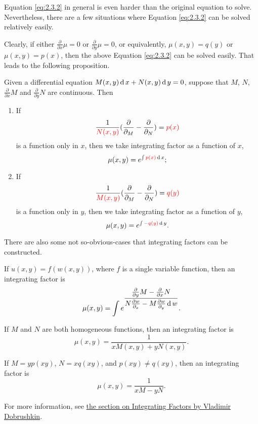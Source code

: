 Equation \ref{eq:2.3.2} in general is even harder than the original equation to solve. Nevertheless, there are a few situations where Equation \ref{eq:2.3.2} can be solved relatively easily.

Clearly, if either $\frac{\partial}{\partial x} \mu=0$ or $\frac{\partial}{\partial y} \mu=0$, or equivalently, $\mu(x, y)=q(y)$ or $\mu(x, y)=p(x)$, then the above Equation \ref{eq:2.3.2} can be solved easily. That leads to the following proposition.

\begin{proposition}\label{prop:intfactor} Given a differential equation $ M(x,y) \operatorname{d} x +  N(x,y) \operatorname{d} y =0$, suppose that $M$, $N$, $\frac{\partial}{\partial x} M$ and $\frac{\partial}{\partial y} N$ are continuous. Then  
\begin{enumerate}[label={Type \Roman*:}, leftmargin=*, align=left]
  \item If \[\frac{1}{{\color{red}N(x,y)}}(\frac{\partial}{\partial_ M}-\frac{\partial}{\partial_ N})={\color{red}p(x)}\]
  is a function {\color{red}only in $x$}, then we take integrating factor as a function of $x$, \[\mu(x,y)=e^{\int {\color{red}p(x)}\operatorname{d} x};\]
  \item If \[\frac{1}{{\color{red}M(x,y)}}(\frac{\partial}{\partial_ M}-\frac{\partial}{\partial_ N})={\color{red}q(y)}\]
  is a function {\color{red} only in $y$}, then we take integrating factor as a function of $y$,
  \[\mu(x,y)=e^{\int {\color{blue}-}{\color{red}q(y)}\operatorname{d} y}.\]
\end{enumerate}
\end{proposition}

\begin{remark}
	There are also some not so-obvious-cases that integrating factors can be constructed.
  
  If $u(x, y)=f(w(x, y))$, where $f$ is a single variable function, then an integrating factor is
  \[\mu(x, y)=\int e^{\dfrac{\frac{\partial}{\partial y} M - \frac{\partial}{\partial x} N}{N\frac{\partial w}{\partial_x}-M\frac{\partial w}{\partial_y}\operatorname{d} w}}.\]

  If $M$ and $N$ are both homogeneous functions, then an integrating factor is
  \[\mu(x,y) = \frac{1}{x M(x,y) + y N(x,y)}.
  \]

  If $M=yp(xy)$, $N=xq(xy)$, and $p(xy)\ne q(xy)$, then an integrating factor is
  \[\mu(x, y)=\frac{1}{xM-yN}.\]

  For more information, see \href{https://www.cfm.brown.edu/people/dobrush/am33/Mathematica/ch2/intfactor.html}{the section on Integrating Factors by Vladimir Dobrushkin}.
\end{remark}	

